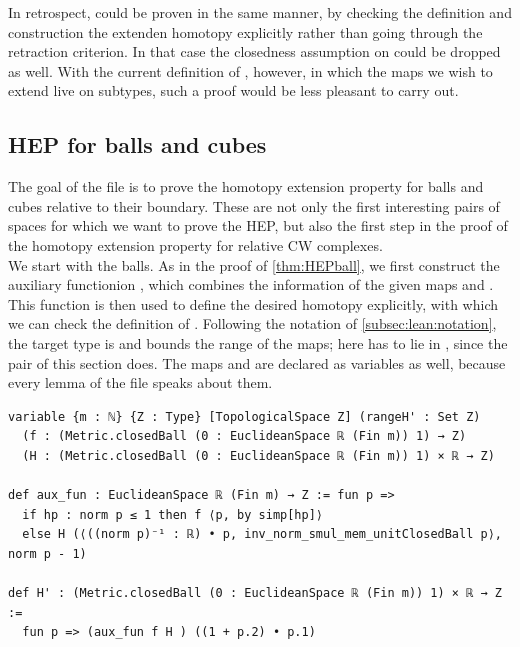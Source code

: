 \documentclass[11pt, a4paper, english]{article}
\theoremstyle{plain}
\theoremstyle{definition}
\theoremstyle{remark}
\numberwithin{equation}{section}
\numberwithin{theorem}{section}
\begin{document}
In retrospect,  could be proven in the same manner, by checking the definition and construction the extenden homotopy explicitly rather than going through the retraction criterion. In that case the closedness assumption on  could be dropped as well. With the current definition of , however, in which the maps we wish to extend live on subtypes, such a proof would be less pleasant to carry out.

\subsection{HEP for balls and cubes} \label{subsec:lean:ballcube}

The goal of the file  is to prove the homotopy extension property for balls and cubes relative to their boundary. These are not only the first interesting pairs of spaces for which we want to prove the HEP, but also the first step in the proof of the homotopy extension property for relative CW complexes. \\
We start with the balls. As in the proof of \cref{thm:HEPball}, we first construct the auxiliary functionion , which combines the information of the given maps  and . This function is then used to define the desired homotopy  explicitly, with which we can check the definition of . Following the notation of \cref{subsec:lean:notation}, the target type is  and  bounds the range of the maps; here  has to lie in , since the pair of this section does. The maps  and  are declared as variables as well, because every lemma of the file speaks about them.

\begin{verbatim}
variable {m : ℕ} {Z : Type} [TopologicalSpace Z] (rangeH' : Set Z)
  (f : (Metric.closedBall (0 : EuclideanSpace ℝ (Fin m)) 1) → Z)
  (H : (Metric.closedBall (0 : EuclideanSpace ℝ (Fin m)) 1) × ℝ → Z)

def aux_fun : EuclideanSpace ℝ (Fin m) → Z := fun p =>
  if hp : norm p ≤ 1 then f ⟨p, by simp[hp]⟩
  else H (⟨((norm p)⁻¹ : ℝ) • p, inv_norm_smul_mem_unitClosedBall p⟩, norm p - 1)

def H' : (Metric.closedBall (0 : EuclideanSpace ℝ (Fin m)) 1) × ℝ → Z :=
  fun p => (aux_fun f H ) ((1 + p.2) • p.1)
\end{verbatim}
\end{document}
